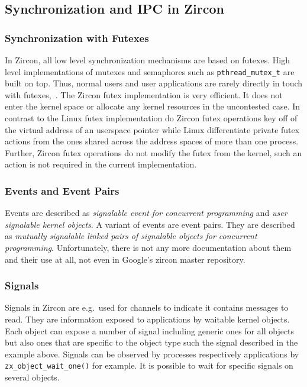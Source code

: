 \subsection{Synchronization and IPC in Zircon}

\subsubsection*{Synchronization with Futexes}
In Zircon, all low level synchronization mechanisms are based on futexes.
High level implementations of mutexes and semaphores such as \texttt{pthread\_mutex\_t} are built on top.
Thus, normal users and user applications are rarely directly in touch with futexes\cite{zircon-concepts},~\cite{zircon-futex}.
The Zircon futex implementation is very efficient.
It does not enter the kernel space or allocate any kernel resources in the uncontested case.
In contrast to the Linux futex implementation do Zircon futex operations key off of the virtual address of an userspace pointer while Linux differentiate private futex actions from the ones shared across the address spaces of more than one process.
Further, Zircon futex operations do not modify the futex from the kernel, such an action is not required in the current implementation\cite{zircon-futex}.

\subsubsection*{Events and Event Pairs}
Events are described as \textit{signalable event for concurrent programming}\cite{zircon-event} and \textit{user signalable kernel objects}\cite{zircon-event}.
A variant of events are event pairs.
They are described as \textit{mutually signalable linked pairs of signalable objects for concurrent programming}\cite{zircon-eventpair}.
Unfortunately, there is not any more documentation about them and their use at all, not even in Google's zircon master repository.

\subsubsection*{Signals}
Signals in Zircon are e.g.\ used for channels to indicate it contains messages to read.
They are information exposed to applications by waitable kernel objects.
Each object can expose a number of signal including generic ones for all objects but also ones that are specific to the object type such the signal described in the example above.
Signals can be observed by processes respectively applications by \texttt{zx\_object\_wait\_one()} for example.
It is possible to wait for specific signals on several objects\cite{zircon-signals}.

